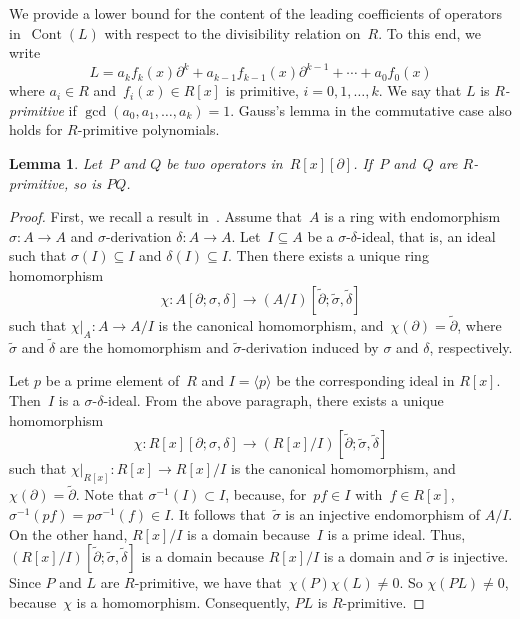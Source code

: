 \documentclass{sig-alternate}
\newcommand{\cont}{\operatorname{Cont}}
\newcommand{\si} { {\sigma}}
\newcommand{\pa}{\partial}
\newtheorem{lemma}[theorem]{Lemma}
\begin{document}
We provide a lower bound for the content of the leading coefficients of operators in~$\cont(L)$
with respect to the divisibility relation on~$R$.
To this end, we write
\[
 L =  a_k f_{k}(x) \pa^k + a_{k - 1} f_{k - 1}(x) \pa^{k - 1} + \cdots + a_0 f_{0}(x)
\]
where $a_i \in R$ and~$f_{i}(x) \in R[x]$ is primitive, $i = 0, 1, \ldots, k$.
We say that $L$ is \emph{$R$-primitive} if $\gcd(a_0, a_1, \ldots, a_k) = 1$.
Gauss's lemma in the commutative case  also holds for $R$-primitive polynomials.
\begin{lemma} \label{LM:Gauss}
Let~$P$ and $Q$ be two operators in~$R[x][\pa]$.
If~$P$ and~$Q$ are $R$-primitive, so is $P Q$.
\end{lemma}
\begin{proof} First, we recall a result in~\cite[Theorem 3.7, Corollary 3.8]{Johannes2011}.
Assume that~$A$ is a ring with endomorphism $\si : A \rightarrow A$ and $\si$-derivation $\delta : A \rightarrow A$.
Let~$I \subseteq A$ be a $\si$-$\delta$-ideal, that is, an ideal such that $\si(I) \subseteq I$ and $\delta(I) \subseteq I$. Then there exists a unique ring
homomorphism
\[
 \chi : A[\pa; \si, \delta] \rightarrow (A/I)[\tilde{\pa}; \tilde{\si}, \tilde{\delta}]
\]
such that $\chi |_{A}: A \rightarrow A/I$ is the canonical homomorphism, and~$\chi(\pa) = \tilde{\pa}$, where $\tilde{\si}$ and
$\tilde{\delta}$ are the homomorphism and $\tilde{\si}$-derivation induced by $\si$ and $\delta$, respectively.



Let $p$ be a prime element of~$R$ and $I = \langle p \rangle$ be the corresponding ideal in $R[x]$.
Then~$I$ is a $\si$-$\delta$-ideal. From the above paragraph, there exists a unique homomorphism
\[
 \chi : R[x][\pa; \si, \delta] \rightarrow (R[x]/I)[\tilde{\pa}; \tilde{\si}, \tilde{\delta}]
\]
such that $\chi |_{R[x]}: R[x] \rightarrow R[x]/I$ is the canonical homomorphism, and~$\chi(\pa) = \tilde{\pa}$.
Note that $\si^{-1}(I)\subset I$, because, for~$p f \in I$ with~$f \in R[x]$,
$\si^{-1}(p f) = p \si^{-1}(f) \in I$. It follows that~$\tilde{\si}$ is an injective endomorphism of $A/I$.
On the other hand, $R[x]/I$ is a domain because~$I$ is a prime ideal.
Thus, $(R[x]/I)[\tilde{\pa}; \tilde{\si}, \tilde{\delta}]$ is a domain because $R[x]/I$ is a domain and $\tilde{\si}$ is injective.
Since $P$ and $L$ are $R$-primitive, we have that~$\chi(P) \chi(L) \neq 0$.  So $\chi(P L) \neq 0 $, because~$\chi$ is a homomorphism.
Consequently, $P L$ is $R$-primitive.
\end{proof}
\end{document}
